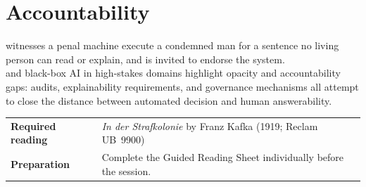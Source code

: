 \chapter{Accountability}




 witnesses a penal machine execute a condemned man for a
sentence no living person can read or explain, and is invited to endorse the system.\\

 and black-box AI in high-stakes domains highlight
opacity and accountability gaps: audits, explainability requirements, and governance mechanisms
all attempt to close the distance between automated decision and human answerability.

\medskip
%
\begin{tabular}{p{3.8cm} p{6.5cm}}
    \textbf{Required reading} &
        \textit{In der Strafkolonie}\index{In der Strafkolonie}\index{Kafka, Franz} by Franz Kafka
        (1919; Reclam UB~9900) \\[3pt]
    \textbf{Preparation}      &
        Complete the Guided Reading Sheet individually before the session. \\
\end{tabular}

